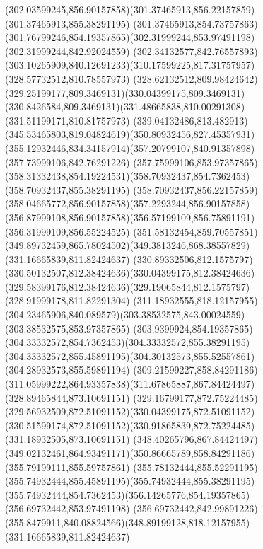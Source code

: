 {{\curveto(302.03599245,856.90157858)(301.37465913,856.22157859)(301.37465913,855.38291195)
\curveto(301.37465913,854.73757863)(301.76799246,854.19357865)(302.31999244,853.97491198)
\lineto(302.31999244,842.92024559)
\lineto(302.34132577,842.76557893)
\curveto(303.10265909,840.12691233)(310.17599225,817.31757957)(328.57732512,810.78557973)
\curveto(328.62132512,809.98424642)(329.25199177,809.3469131)(330.04399175,809.3469131)
\curveto(330.8426584,809.3469131)(331.48665838,810.00291308)(331.51199171,810.81757973)
\curveto(339.04132486,813.482913)(345.53465803,819.04824619)(350.80932456,827.45357931)
\curveto(355.12932446,834.34157914)(357.20799107,840.91357898)(357.73999106,842.76291226)
\lineto(357.75999106,853.97357865)
\curveto(358.31332438,854.19224531)(358.70932437,854.7362453)(358.70932437,855.38291195)
\curveto(358.70932437,856.22157859)(358.04665772,856.90157858)(357.2293244,856.90157858)
\curveto(356.87999108,856.90157858)(356.57199109,856.75891191)(356.31999109,856.55224525)
\curveto(351.58132454,859.70557851)(349.89732459,865.78024502)(349.3813246,868.38557829)
\moveto(331.16665839,811.82424637)
\curveto(330.89332506,812.1575797)(330.50132507,812.38424636)(330.04399175,812.38424636)
\curveto(329.58399176,812.38424636)(329.19065844,812.1575797)(328.91999178,811.82291304)
\curveto(311.18932555,818.12157955)(304.23465906,840.089579)(303.38532575,843.00024559)
\lineto(303.38532575,853.97357865)
\curveto(303.9399924,854.19357865)(304.33332572,854.7362453)(304.33332572,855.38291195)
\curveto(304.33332572,855.45891195)(304.30132573,855.52557861)(304.28932573,855.59891194)
\curveto(309.21599227,858.84291186)(311.05999222,864.93357838)(311.67865887,867.84424497)
\lineto(328.89465844,873.10691151)
\curveto(329.16799177,872.75224485)(329.56932509,872.51091152)(330.04399175,872.51091152)
\curveto(330.51599174,872.51091152)(330.91865839,872.75224485)(331.18932505,873.10691151)
\lineto(348.40265796,867.84424497)
\curveto(349.02132461,864.93491171)(350.86665789,858.84291186)(355.79199111,855.59757861)
\curveto(355.78132444,855.52291195)(355.74932444,855.45891195)(355.74932444,855.38291195)
\curveto(355.74932444,854.7362453)(356.14265776,854.19357865)(356.69732442,853.97491198)
\lineto(356.69732442,842.99891226)
\curveto(355.8479911,840.08824566)(348.89199128,818.12157955)(331.16665839,811.82424637)
}
}
{
}

